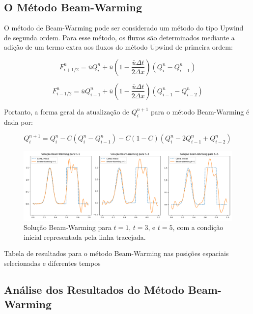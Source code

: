 \subsection{O Método Beam-Warming}

O método de Beam-Warming pode ser considerado um método do tipo Upwind de segunda ordem. Para esse método, os fluxos são determinados mediante a adição de um termo extra aos fluxos do método Upwind de primeira ordem:

\begin{equation}
F_{i+1/2}^n = \bar{u} Q_i^n + \bar{u} \left(1 - \frac{\bar{u} \Delta t}{2 \Delta x}\right) (Q_i^n - Q_{i-1}^n)
\end{equation}

\begin{equation}
F_{i-1/2}^n = \bar{u} Q_{i-1}^n + \bar{u} \left(1 - \frac{\bar{u} \Delta t}{2 \Delta x}\right) (Q_{i-1}^n - Q_{i-2}^n)
\end{equation}

Portanto, a forma geral da atualização de \( Q_i^{n+1} \) para o método Beam-Warming é dada por:

\begin{equation}
Q_i^{n+1} = Q_i^n - C(Q_i^n - Q_{i-1}^n) - C(1 - C)(Q_i^n - 2 Q_{i-1}^n + Q_{i-2}^n)
\end{equation}

\begin{figure}[H]
    \centering
    \includegraphics[width=\textwidth]{code/images/Beam-Warming.png}
    \caption{Solução Beam-Warming para $t=1$, $t=3$, e $t=5$, com a condição inicial representada pela linha tracejada.}
\end{figure}

\begin{table}[H]
    \centering
    
    \caption{Tabela de resultados para o método Beam-Warming nas posições espaciais selecionadas e diferentes tempos}
    \label{tab:beam_warming}
\end{table}

\subsection{Análise dos Resultados do Método Beam-Warming}

